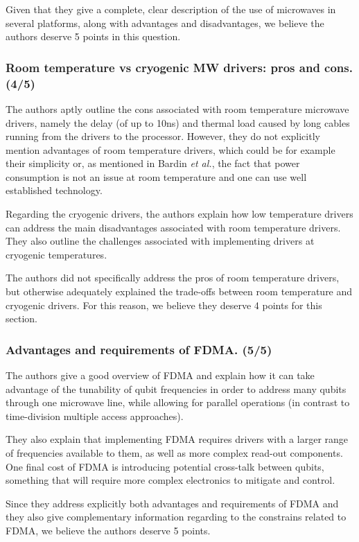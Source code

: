 \documentclass[11pt]{article}
\begin{document}
Given that they give a complete, clear description of the use of
microwaves in several platforms, along with advantages and
disadvantages, we believe the authors deserve 5 points in this
question.

\subsubsection{Room temperature vs cryogenic MW drivers: pros and cons. (4/5)}
\label{sec:org5e1809f}
The authors aptly outline the cons associated with room
temperature microwave drivers, namely the delay (of up to 10ns)
and thermal load caused by long cables running from the drivers to
the processor. However, they do not explicitly mention advantages
of room temperature drivers, which could be for example their
simplicity or, as mentioned in Bardin \emph{et al.}, the fact that power
consumption is not an issue at room temperature and one can use
well established technology.

Regarding the cryogenic drivers, the authors explain how low
temperature drivers can address the main disadvantages associated
with room temperature drivers. They also outline the challenges
associated with implementing drivers at cryogenic temperatures.

The authors did not specifically address the pros of room
temperature drivers, but otherwise adequately explained the
trade-offs between room temperature and cryogenic drivers. For
this reason, we believe they deserve 4 points for this section.

\subsubsection{Advantages and requirements of FDMA. (5/5)}
\label{sec:orgb526cf4}
The authors give a good overview of FDMA and explain how it can
take advantage of the tunability of qubit frequencies in order to
address many qubits through one microwave line, while allowing for
parallel operations (in contrast to time-division multiple access
approaches). 

They also explain that implementing FDMA requires drivers with a
larger range of frequencies available to them, as well as more
complex read-out components. One final cost of FDMA is introducing
potential cross-talk between qubits, something that will require
more complex electronics to mitigate and control.

Since they address explicitly both advantages and requirements of FDMA and
they also give complementary information regarding to the constrains related
to FDMA, we believe the authors deserve 5 points.
\end{document}
